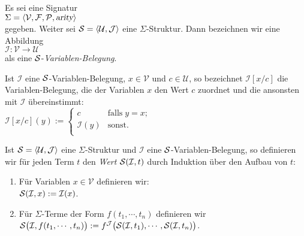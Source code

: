 \begin{Definition}
    Es sei eine  Signatur \\[0.2cm]
    \hspace*{1.3cm} $\Sigma = \langle \mathcal{V}, \mathcal{F}, \mathcal{P}, \textsl{arity} \rangle$ \\[0.2cm]
    gegeben.  Weiter sei $\mathcal{S} = \langle \mathcal{U}, \mathcal{J} \rangle$ eine $\Sigma$-Struktur.  Dann bezeichnen wir 
     eine Abbildung \\[0.2cm]
    \hspace*{1.3cm} $\mathcal{I}: \mathcal{V} \rightarrow \mathcal{U}$ \\[0.2cm]
    als eine     $\mathcal{S}$-\emph{Variablen-Belegung}.

    Ist $\mathcal{I}$ eine $\mathcal{S}$-Variablen-Belegung,
    $x \in \mathcal{V}$ und $c \in \mathcal{U}$, so bezeichnet $\mathcal{I}[x/c]$ die Variablen-Belegung, die 
    der Variablen $x$ den Wert $c$ zuordnet und die ansonsten mit $\mathcal{I}$ \"{u}bereinstimmt: \\[0.2cm]
    \hspace*{1.3cm} 
    $\mathcal{I}[x/c](y) := \left\{
    \begin{array}{ll}
    c               & \mbox{falls}\; y = x;  \\
    \mathcal{I}(y)  & \mbox{sonst}.          \\
    \end{array}
    \right.$ \eox
\end{Definition}

\begin{Definition}
    Ist $\struct = \pair(\mathcal{U},\mathcal{J})$ eine $\Sigma$-Struktur und $\mathcal{I}$ eine $\mathcal{S}$-Variablen-Belegung,
    so definieren wir f\"{u}r jeden Term $t$ den \emph{Wert} $\mathcal{S}(\mathcal{I}, t)$ durch Induktion \"{u}ber den Aufbau
    von $t$:
    \begin{enumerate}
    \item F\"{u}r Variablen $x \in \mathcal{V}$ definieren wir: \\[0.2cm]
          \hspace*{1.3cm} $\mathcal{S}(\mathcal{I}, x) := \mathcal{I}(x)$.
    \item F\"{u}r $\Sigma$-Terme der Form $f(t_1,\cdots,t_n)$ definieren wir \\[0.2cm]
          \hspace*{1.3cm} $\mathcal{S}\bigl(\mathcal{I}, f(t_1,\cdots,t_n)\bigr) := 
                           f^\mathcal{J}\bigl( \mathcal{S}(\mathcal{I}, t_1), \cdots, \mathcal{S}(\mathcal{I}, t_n) \bigr)$.
                           \eox
    \end{enumerate}
\end{Definition}

